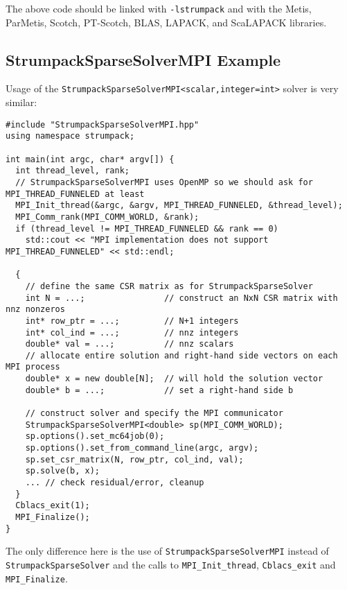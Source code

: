 \documentclass{article}
\begin{document}
The above code should be linked with
\lstinline[style=Bash]!-lstrumpack! and with the Metis,
ParMetis, Scotch, PT-Scotch, BLAS, LAPACK, and ScaLAPACK libraries.\\

\subsection{StrumpackSparseSolverMPI Example}
Usage of the
\lstinline[style=C]!StrumpackSparseSolverMPI<scalar,integer=int>!
solver is very similar:
\begin{lstlisting}[style=C]
#include "StrumpackSparseSolverMPI.hpp"
using namespace strumpack;

int main(int argc, char* argv[]) {
  int thread_level, rank;
  // StrumpackSparseSolverMPI uses OpenMP so we should ask for MPI_THREAD_FUNNELED at least
  MPI_Init_thread(&argc, &argv, MPI_THREAD_FUNNELED, &thread_level);
  MPI_Comm_rank(MPI_COMM_WORLD, &rank);
  if (thread_level != MPI_THREAD_FUNNELED && rank == 0)
    std::cout << "MPI implementation does not support MPI_THREAD_FUNNELED" << std::endl;

  {
    // define the same CSR matrix as for StrumpackSparseSolver
    int N = ...;                // construct an NxN CSR matrix with nnz nonzeros
    int* row_ptr = ...;         // N+1 integers
    int* col_ind = ...;         // nnz integers
    double* val = ...;          // nnz scalars
    // allocate entire solution and right-hand side vectors on each MPI process
    double* x = new double[N];  // will hold the solution vector
    double* b = ...;            // set a right-hand side b

    // construct solver and specify the MPI communicator
    StrumpackSparseSolverMPI<double> sp(MPI_COMM_WORLD);
    sp.options().set_mc64job(0);
    sp.options().set_from_command_line(argc, argv);
    sp.set_csr_matrix(N, row_ptr, col_ind, val);
    sp.solve(b, x);
    ... // check residual/error, cleanup
  }
  Cblacs_exit(1);
  MPI_Finalize();
}
\end{lstlisting}
The only difference here is the use of
\lstinline[style=C]!StrumpackSparseSolverMPI! instead of
\lstinline[style=C]!StrumpackSparseSolver! and the calls to
\lstinline[style=C]!MPI_Init_thread!, \lstinline[style=C]!Cblacs_exit!
and \lstinline[style=C]!MPI_Finalize!.\\
\end{document}
